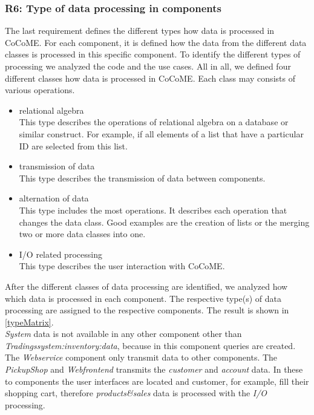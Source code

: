 \subsubsection{R6: Type of data processing in components}
\label{relevantpartsCoCoME}
The last requirement defines the different types how data is processed in CoCoME. For each component, it is defined how the data from the different data classes is processed in this specific component. To identify the different types of processing we analyzed the code and the use cases. All in all, we defined four different classes how data is processed in CoCoME. Each class may consists of various operations.
\begin{itemize}
\item relational algebra \\ This type describes the operations of relational algebra on a database or similar construct. For example, if all elements of a list that have a particular ID are selected from this list.
\item transmission of data \\ This type describes the transmission of data between components.
\item alternation of data \\ This type includes the most operations. It describes each operation that changes the data class. Good examples are the creation of lists or the merging two or more data classes into one.
\item I/O related processing \\  This type describes the user interaction with CoCoME. 
\end{itemize}
After the different classes of data processing are identified, we analyzed how which data is processed in each component. The respective type(s) of data processing are assigned to the respective components. The result is shown in \autoref{typeMatrix}. \\
\textit{System} data is not available in any other component other than \textit{Tradingssystem:inventory:data}, because in this component queries are created. The \textit{Webservice} component only transmit data to other components. The \textit{PickupShop} and \textit{Webfrontend} transmits the \textit{customer} and \textit{account} data. In these to components the user interfaces are located and customer, for example, fill their shopping cart, therefore \textit{products\&sales} data is processed with the \textit{I/O} processing.

